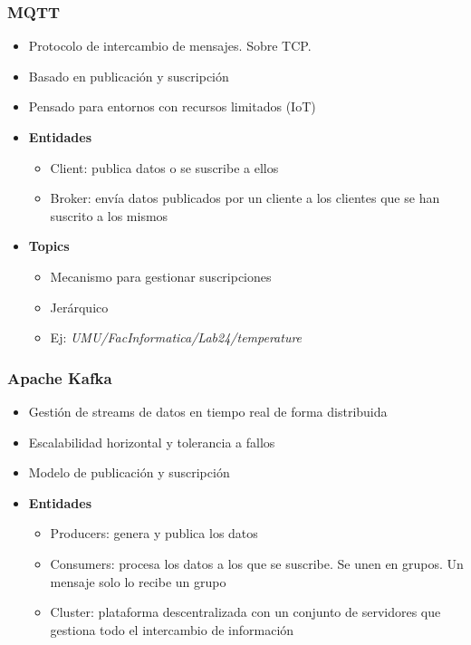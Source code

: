 \documentclass[12pt]{beamer}
\begin{document}
        \begin{frame}
            \frametitle{MQTT}

            \begin{itemize}
                \item Protocolo de intercambio de mensajes. Sobre TCP.
                \item Basado en publicación y suscripción
                \item Pensado para entornos con recursos limitados (IoT)
                \item \textbf{Entidades}
                \begin{itemize}
                \item Client: publica datos o se suscribe a ellos
                \item Broker: envía datos publicados por un cliente a los clientes que se han suscrito a los mismos
                \end{itemize}
                \item \textbf{Topics}
                \begin{itemize}
                    \item Mecanismo para gestionar suscripciones
                    \item Jerárquico
                    \item Ej: \textit{UMU/FacInformatica/Lab24/temperature}
                \end{itemize}
            \end{itemize}
        \end{frame}

        \begin{frame}
            \frametitle{Apache Kafka}

            \begin{itemize}
                \item Gestión de streams de datos en tiempo real de forma distribuida
                \item Escalabilidad horizontal y tolerancia a fallos
                \item Modelo de publicación y suscripción
                \item \textbf{Entidades}
                \begin{itemize}
                \item Producers: genera y publica los datos
                \item Consumers: procesa los datos a los que se suscribe. Se unen en grupos. Un mensaje solo lo recibe un grupo
                \item Cluster: plataforma descentralizada con un conjunto de servidores que gestiona todo el intercambio de información
                \end{itemize}            \end{itemize}
        \end{frame}
\end{document}
